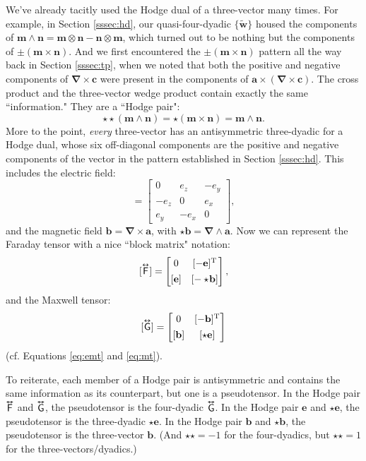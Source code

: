 \documentclass[12pt]{article}
\renewcommand{\vv}[1]{\mathbf{#1}}
\newcommand{\del}{\boldsymbol{\nabla}}
\newcommand{\tightoverset}[2]{%
  \mathop{#2}\limits^{\vbox to -.5ex{\kern-0.75ex\hbox{$#1$}\vss}}}
\newcommand{\inlinedy}[1]{\tightoverset{\text{\tiny$\bm\leftrightarrow$}}{#1}}
\newcommand{\capdy}[1]{ \overset{ \text{\tiny$\bm\leftrightarrow$} }{\vphantom{\text{\small{A}}}\smash{#1}} }
\begin{document}
We've already tacitly used the Hodge dual of a three-vector many times. For example, in Section \ref{sssec:hd}, our quasi-four-dyadic $\{ \tilde{\vv w} \}$ housed the components of $ \vv m \wedge \vv n = \vv m \otimes \vv n - \vv n \otimes \vv m $, which turned out to be nothing but the components of $\pm ( \vv m \times \vv n )$. And we first encountered the $\pm ( \vv m \times \vv n )$ pattern all the way back in Section \ref{sssec:tp}, when we noted that both the positive and negative components of $\del \times \vv c$ were present in the components of $\vv a \times ( \del \times \vv c )$. The cross product and the three-vector wedge product contain exactly the same ``information." They are a ``Hodge pair":
\begin{equation*}
\star \star ( \vv m \wedge \vv n ) = \star ( \vv m \times \vv n ) = \vv m \wedge \vv n . 
\end{equation*}
More to the point, \emph{every} three-vector has an antisymmetric three-dyadic for a Hodge dual, whose six off-diagonal components are the positive and negative components of the vector in the pattern established in Section \ref{sssec:hd}. This includes the electric field:
\begin{equation*}
[ \star \vv e ]
=
\begin{bmatrix}
0 & e_z & -e_y \\
-e_z & 0 & e_x \\
e_y & -e_x & 0
\end{bmatrix} ,
\end{equation*}
and the magnetic field $\vv b = \del \times \vv a$, with $\star \vv b = \del \wedge \vv a$. Now we can represent the Faraday tensor with a nice ``block matrix" notation:
\begin{equation}\label{eq:ftc}
[ \capdy{\mathsf{F}} ]
=
\begin{bmatrix}
0 & [ - \vv e ]^\mathrm{T} \\[1ex]
[ \vv e ] & [ - \star \mkern-3mu \vv b ]
\end{bmatrix} ,
\end{equation}
and the Maxwell tensor:
\begin{equation}\label{eq:gtc}
[ \capdy{\mathsf{G}} ]
=
\begin{bmatrix}
0 & [ - \vv b ]^\mathrm{T} \\[1ex]
[ \vv b ] & [ \star \vv e ]
\end{bmatrix}
\end{equation}
(cf. Equations \ref{eq:emt} and \ref{eq:mt}).

To reiterate, each member of a Hodge pair is antisymmetric and contains the same information as its counterpart, but one is a pseudotensor. In the Hodge pair $\inlinedy{\mathsf{F}}$ and $\inlinedy{\mathsf{G}}$, the pseudotensor is the four-dyadic $\inlinedy{\mathsf{G}}$. In the Hodge pair $\vv e$ and $\star \vv e$, the pseudotensor is the three-dyadic $\star \vv e$. In the Hodge pair $\vv b$ and $\star \vv b$, the pseudotensor is the three-vector $\vv b$. (And $\star \star = - 1$ for the four-dyadics, but $\star \star = 1$ for the three-vectors/dyadics.)
\end{document}
